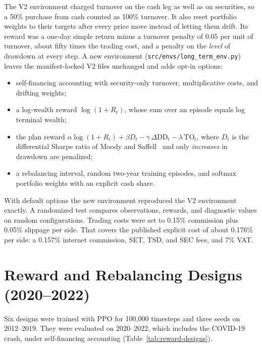 The V2 environment charged turnover on the cash leg as well as on securities, so a 50\% purchase
from cash counted as 100\% turnover. It also reset portfolio weights to their targets after every
price move instead of letting them drift. Its reward was a one-day simple return minus a turnover
penalty of $0.05$ per unit of turnover, about fifty times the trading cost, and a penalty on the
\emph{level} of drawdown at every step. A new environment (\texttt{src/envs/long\_term\_env.py})
leaves the manifest-locked V2 files unchanged and adds opt-in options:

\begin{itemize}
  \item self-financing accounting with security-only turnover, multiplicative costs, and drifting weights;
  \item a log-wealth reward $\log(1+R_t)$, whose sum over an episode equals log terminal wealth;
  \item the plan reward $\alpha\log(1+R_t)+\beta D_t-\gamma\,\Delta\mathrm{DD}_t-\lambda\,\mathrm{TO}_t$, where $D_t$ is the differential Sharpe ratio of Moody and Saffell~\cite{moody2001drl} and only \emph{increases} in drawdown are penalized;
  \item a rebalancing interval, random two-year training episodes, and softmax portfolio weights with an explicit cash share.
\end{itemize}

With default options the new environment reproduced the V2 environment exactly. A randomized test
compares observations, rewards, and diagnostic values on random configurations. Trading costs were
set to 0.15\% commission plus 0.05\% slippage per side. That covers the published explicit cost of
about 0.176\% per side: a 0.157\% internet commission, SET, TSD, and SEC fees, and 7\% VAT.

\section{Reward and Rebalancing Designs (2020--2022)}
\label{sec:reward-designs}

Six designs were trained with PPO for 100{,}000 timesteps and three seeds on 2012--2019. They were
evaluated on 2020--2022, which includes the COVID-19 crash, under self-financing accounting
(Table~\ref{tab:reward-designs}).

